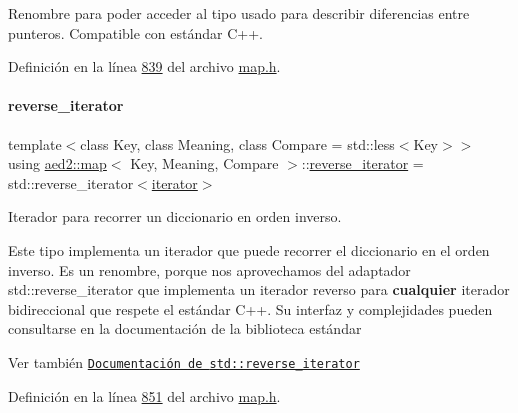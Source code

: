 Renombre para poder acceder al tipo usado para describir diferencias entre punteros. Compatible con estándar C++. 



Definición en la línea \hyperlink{map_8h_source_l00839}{839} del archivo \hyperlink{map_8h_source}{map.\+h}.

\mbox{\label{classaed2_1_1map_a8e6a592062260177fd73b2f9897b1dd5_a8e6a592062260177fd73b2f9897b1dd5}} 
\paragraph{\texorpdfstring{reverse\+\_\+iterator}{reverse\_iterator}}
{\footnotesize\ttfamily template$<$class Key, class Meaning, class Compare = std\+::less$<$\+Key$>$$>$ \\
using \hyperlink{classaed2_1_1map}{aed2\+::map}$<$ Key, Meaning, Compare $>$\+::\hyperlink{classaed2_1_1map_a8e6a592062260177fd73b2f9897b1dd5_a8e6a592062260177fd73b2f9897b1dd5}{reverse\+\_\+iterator} =  std\+::reverse\+\_\+iterator$<$\hyperlink{classaed2_1_1map_1_1iterator}{iterator}$>$}



Iterador para recorrer un diccionario en orden inverso. 

Este tipo implementa un iterador que puede recorrer el diccionario en el orden inverso. Es un renombre, porque nos aprovechamos del adaptador {\ttfamily std\+::reverse\+\_\+iterator} que implementa un iterador reverso para {\bfseries cualquier} iterador bidireccional que respete el estándar C++. Su interfaz y complejidades pueden consultarse en la documentación de la biblioteca estándar

\begin{DoxySeeAlso}{Ver también}
\href{http://en.cppreference.com/w/cpp/iterator/reverse_iterator}{\tt Documentación de {\ttfamily std\+::reverse\+\_\+iterator}} 
\end{DoxySeeAlso}


Definición en la línea \hyperlink{map_8h_source_l00851}{851} del archivo \hyperlink{map_8h_source}{map.\+h}.

\mbox{\label{classaed2_1_1map_aed66a216549d13078a3ea6978ea0b768_aed66a216549d13078a3ea6978ea0b768}} 
